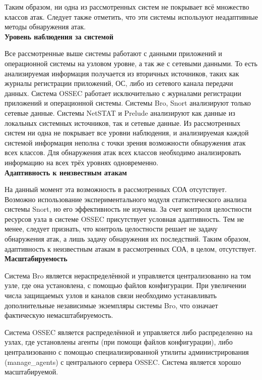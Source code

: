 Таким образом, ни одна из рассмотренных систем не покрывает всё множество
классов атак. Следует также отметить, что эти системы используют неадаптивные
методы обнаружения атак.\\

\textbf{Уровень наблюдения за системой}

Все рассмотренные выше системы работают с данными приложений и
операционной системы на узловом уровне, а так же с сетевыми данными. То есть
анализируемая информация получается из вторичных источников, таких как журналы
регистрации приложений, ОС, либо из сетевого канала передачи данных.
Система OSSEC работает исключительно с журналами регистрации приложений и
операционной системы. Системы Bro, Snort анализируют только сетевые данные.
Системы NetSTAT и Prelude анализируют как данные из локальных системных
источников, так и сетевые данные.
Из рассмотренных систем ни одна не покрывает все уровни наблюдения, и
анализируемая каждой системой информация неполна с точки зрения возможности
обнаружения атак всех классов. Для обнаружения атак всех классов необходимо
анализировать информацию на всех трёх уровнях одновременно.\\

\textbf{Адаптивность к неизвестным атакам}

На данный момент эта возможность в рассмотренных СОА отсутствует. Возможно
использование экспериментального модуля статистического анализа системы Snort, но
его эффективность не изучена. За счет контроля целостности ресурсов узла в системе
OSSEC присутствует условная адаптивность. Тем не менее, следует признать, что
контроль целостности решает не задачу обнаружения атак, а лишь задачу обнаружения
их последствий. Таким образом, адаптивность к неизвестным атакам в рассмотренных
СОА, в целом, отсутствует.\\

\textbf{Масштабируемость}

Система Bro является нераспределённой и управляется централизованно на том
узле, где она установлена, с помощью файлов конфигурации. При увеличении числа
защищаемых узлов и каналов связи необходимо устанавливать дополнительные
независимые экземпляры системы Bro, что означает фактическую немасштабируемость.

Система OSSEC является распределённой и управляется либо распределенно на
узлах, где установлены агенты (при помощи файлов конфигурации), либо
централизованно с помощью специализированной утилиты администрирования
(manage_agents) с центрального сервера OSSEC. Система является хорошо
масштабируемой.

